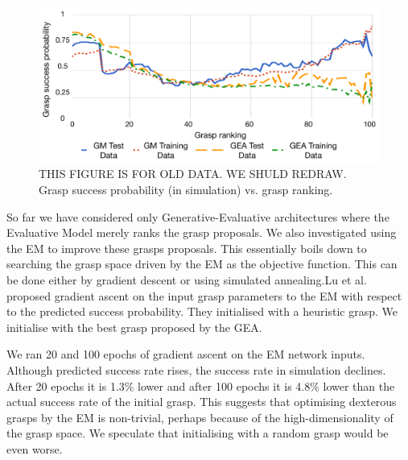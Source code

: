\begin{figure}[t]
  \includegraphics[width=\linewidth]{images/successvsranking.pdf}
  \caption{THIS FIGURE IS FOR OLD DATA. WE SHULD REDRAW. Grasp success probability (in simulation) vs. grasp ranking.}
  \label{fig:successvsranking}
\end{figure}

So far we have considered only Generative-Evaluative architectures where the Evaluative Model merely ranks the grasp proposals. We also investigated using the EM to improve these grasps proposals. This essentially boils down to searching the grasp space driven by the EM as the objective function. This can be done either by gradient descent or using simulated annealing.Lu et al. \cite{lu2017planning} proposed gradient ascent on the input grasp parameters to the EM with respect to the predicted success probability. They initialised with a heuristic grasp. We initialise with the best grasp proposed by the GEA. 

We ran 20 and 100 epochs of gradient ascent on the EM network inputs. Although predicted success rate rises, the success rate in simulation declines. After 20 epochs it is 1.3\% lower and after 100 epochs it is 4.8\% lower than the actual success rate of the initial grasp. This suggests that optimising dexterous grasps by the EM is non-trivial, perhaps because of the high-dimensionality of the grasp space. We speculate that initialising with a random grasp would be even worse.

